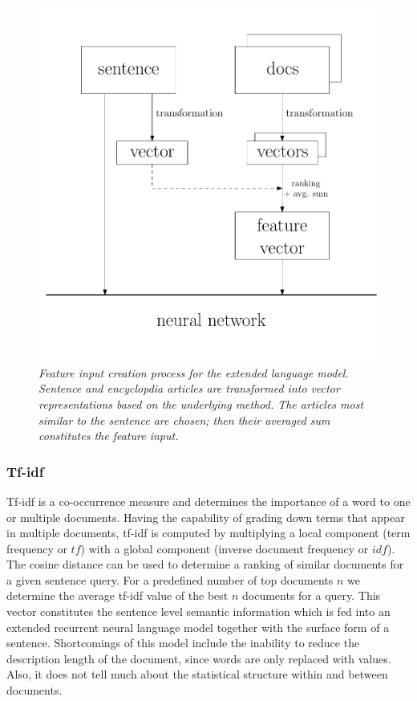\documentclass[a4paper]{article}
\begin{document}
\begin{figure} 
\centering 
\includegraphics[width=\columnwidth]{flow.pdf}
\caption{\it Feature input creation process for the extended language model. Sentence and encyclopdia articles are transformed into vector representations based on the underlying method. The articles most similar to the sentence are chosen; then their averaged sum constitutes the feature input.}
\label{fig:flow}
\end{figure}

\subsubsection{Tf-idf}
Tf-idf \cite{salton1986introduction} is a co-occurrence measure and determines the importance of a word to one or multiple documents. Having the capability of grading down terms that appear in multiple documents, tf-idf is computed by multiplying a local component (term frequency or $tf$) with a global component (inverse document frequency or $idf$).
The cosine distance can be used to determine a ranking of similar documents for a given sentence query.
For a predefined number of top documents $n$ we determine the average tf-idf value of the best $n$ documents for a query.
This vector constitutes the sentence level semantic information which is fed into an extended recurrent neural language model together with the surface form of a sentence.
Shortcomings of this model include the inability to reduce the description length of the document, since words are only replaced with values. Also, it does not tell much about the statistical structure within and between documents.
\end{document}
